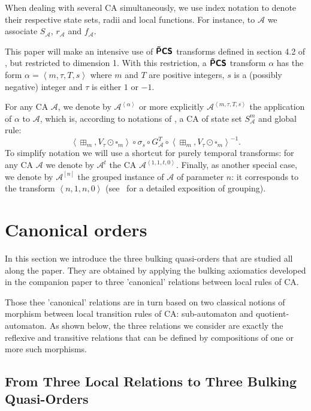\documentclass[a4paper]{elsarticle}
\newcommand{\ACA}{\mathcal{A}}
\newcommand{\locA}{f_{\ACA}}
\newcommand\alphabe[1]{S_{#1}}
\newcommand{\alphA}{\alphabe{\ACA}}
\newcommand{\radA}{r_{\ACA}}
\newcommand\sfbop[1]{\operatorname{\hbox{\usefont{T1}{cmss}{bx}{n}#1}}}
\newcommand\tPmCS{\sfbop{\~{P}CS}}
\newcommand\bulk[2]{{#1}^{\left\langle{#2}\right\rangle}}
\newcommand\grp[2]{{#1}^{[#2]}}
\begin{document}
When dealing with several CA simultaneously, we use index notation to
denote their respective state sets, radii and local functions. For
instance, to $\ACA$ we associate $\alphA$, $\radA$ and $\locA$.

This paper will make an intensive use of $\tPmCS$ transforms defined
in section 4.2 of \cite{bulking1}, but restricted to dimension 1. With
this restriction, a $\tPmCS$ transform $\alpha$ has the form
$\alpha=\left\langle m,\tau,T,s\right\rangle$ where $m$ and $T$ are
positive integers, $s$ is a (possibly negative) integer and $\tau$ is
either $1$ or $-1$.

For any CA $\ACA$, we denote by $\bulk{\ACA}{\alpha}$ or more
explicitly $\bulk{\ACA}{m,\tau,T,s}$ the application of $\alpha$ to
$\ACA$, which is, according to notations of \cite{bulking1}, a CA of
state set $\alphA^m$ and global rule:
\[\left\langle\boxplus_m,V_\tau\odot\square_m\right\rangle\circ\sigma_s\circ
G_{\mathcal{A}}^T\circ\left\langle\boxplus_m,V_\tau\odot\square_m\right\rangle^{-1}.\]
To simplify notation we will use a shortcut for purely temporal
transforms: for any CA $\ACA$ we denote by $\ACA^t$ the CA
$\bulk{\ACA}{1,1,t,0}$. Finally, as another special case, we denote
by $\grp{\ACA}{n}$ the grouped instance of $\ACA$ of parameter $n$: it
corresponds to the transform $\left\langle n, 1, n, 0\right\rangle$
(see~\cite{bulking1} for a detailed exposition of grouping).

\section{Canonical orders}
\label{sec:co}

In this section we introduce the three bulking quasi-orders that are
studied all along the paper. They are obtained by applying the bulking
axiomatics developed in the companion paper \cite{bulking1} to three
'canonical' relations between local rules of CA.

Those thee 'canonical' relations are in turn based on two classical
notions of morphism between local transition rules of CA:
sub-automaton and quotient-automaton. As shown below, the three
relations we consider are exactly the reflexive and transitive
relations that can be defined by compositions of one or more such
morphisms.


\subsection{From Three Local Relations to Three Bulking Quasi-Orders}
\label{sec:canondef}
\end{document}
